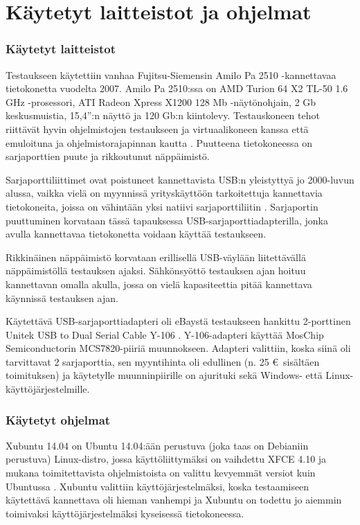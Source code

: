 \section{Käytetyt laitteistot ja ohjelmat}
\subsubsection{Käytetyt laitteistot}
Testaukseen käytettiin vanhaa Fujitsu-Siemensin Amilo Pa 2510 -kannettavaa tietokonetta vuodelta 2007. Amilo Pa 2510:ssa on AMD Turion 64 X2 TL-50 1.6 GHz -prosessori, ATI Radeon Xpress X1200 128 Mb -näytönohjain, 2 Gb keskusmuistia, 15,4'':n näyttö ja 120 Gb:n kiintolevy. Testauskoneen tehot riittävät hyvin ohjelmistojen testaukseen ja virtuaalikoneen kanssa että emuloituna ja ohjelmistorajapinnan kautta \cite{fs_amilo:review}. Puutteena tietokoneessa on sarjaporttien puute ja rikkoutunut näppäimistö.

Sarjaporttiliittimet ovat poistuneet kannettavista USB:n yleistyttyä jo 2000-luvun alussa, vaikka vielä on myynnissä yrityskäyttöön tarkoitettuja kannettavia tietokoneita, joissa on vähintään yksi natiivi sarjaporttiliitin \cite{hp:laptop}. Sarjaportin puuttuminen korvataan tässä tapauksessa USB-sarjaporttiadapterilla, jonka avulla kannettavaa tietokonetta voidaan käyttää testaukseen.

Rikkinäinen näppäimistö korvataan erillisellä USB-väylään liitettävällä näppäimistöllä testauksen ajaksi. Sähkönsyöttö testauksen ajan hoituu kannettavan omalla akulla, jossa on vielä kapasiteettia pitää kannettava käynnissä testauksen ajan.

Käytettävä USB-sarjaporttiadapteri oli eBaystä testaukseen hankittu 2-porttinen Unitek USB to Dual Serial Cable Y-106 \cite{serial:unitek}. Y-106-adapteri käyttää MosChip Semiconductorin MCS7820-piiriä muunnokseen. Adapteri valittiin, koska siinä oli tarvittavat 2 sarjaporttia, sen myyntihinta oli edullinen (n. 25 € sisältäen toimituksen) ja käytetylle muunninpiirille on ajurituki sekä Windows- että Linux-käyttöjärjestelmille.


\subsubsection{Käytetyt ohjelmat}
Xubuntu 14.04 on Ubuntu 14.04:ään perustuva (joka taas on Debianiin perustuva) Linux-distro, jossa käyttöliittymäksi on vaihdettu XFCE 4.10 ja mukana toimitettavista ohjelmistoista on valittu kevyemmät versiot kuin Ubuntussa \cite{xubuntu:about}. Xubuntu valittiin käyttöjärjestelmäksi, koska testaamiseen käytettävä kannettava oli hieman vanhempi ja Xubuntu on todettu jo aiemmin toimivaksi käyttöjärjestelmäksi kyseisessä tietokoneessa.

